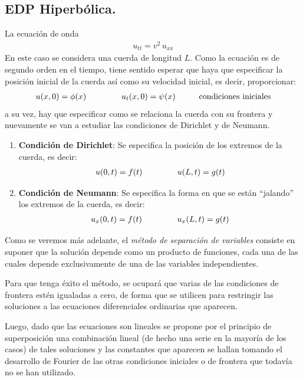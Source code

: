 \subsection{EDP Hiperbólica.}
La ecuación de onda
\begin{align*}
u_{tt} = v^{2} \, u_{xx}
\end{align*}
En este caso se considera una cuerda de longitud $L$. Como la ecuación es de segundo orden en el tiempo, tiene sentido esperar que haya que especificar la posición inicial de la cuerda así como su velocidad inicial, es decir, proporcionar:
\begin{align}
u(x, 0) = \phi (x) \hspace{1.5cm} u_{t}(x, 0) = \psi (x) \hspace{1cm} \mbox{condiciones iniciales}
\label{eq:ecuacion_06_02_07}
\end{align}
a su vez, hay que especificar como se relaciona la cuerda con su frontera y nuevamente se van a estudiar las condiciones de Dirichlet y de Neumann.
\begin{enumerate}
\item \textbf{Condición de Dirichlet}: Se especifica la posición de los extremos de la cuerda, es decir:
\begin{align}
u(0, t) = f (t) \hspace{1.5cm} u(L, t) = g(t)
\label{eq:ecuacion_06_02_08}   
\end{align}
\item \textbf{Condición de Neumann}: Se especifica la forma en que se están \enquote{jalando} los extremos de la cuerda, es decir:
\begin{align}
u_{x}(0, t) = f(t) \hspace{1.5cm} u_{x}(L,t) = g(t)
\label{eq:ecuacion_06_02_09}    
\end{align}
\end{enumerate}
Como se veremos más adelante, el \emph{método de separación de variables} consiste en suponer que la solución depende como un producto de funciones, cada una de las cuales depende exclusivamente de una de las variables independientes.
\par
Para que tenga éxito el método, se ocupará que varias de las condiciones de frontera estén igualadas a cero, de forma que se utilicen para restringir las soluciones a las ecuaciones diferenciales ordinarias que aparecen.
\par
Luego, dado que las ecuaciones son lineales se propone por el principio de superposición una combinación lineal (de hecho una serie en la mayoría de los casos) de tales soluciones y las constantes que aparecen se hallan tomando el desarrollo de Fourier de las otras condiciones iniciales o de frontera que todavía no se han utilizado.
